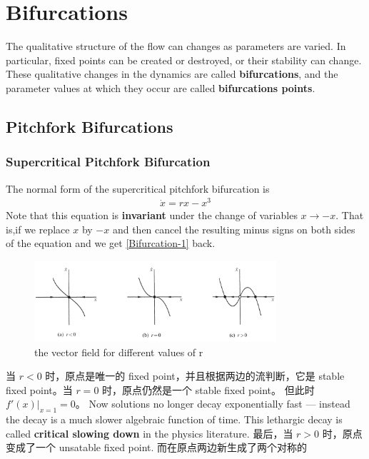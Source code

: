 \section{Bifurcations}
The qualitative structure of the flow can changes as parameters are varied. In particular, 
fixed points can be created or destroyed, or their stability can change. These qualitative 
changes in the dynamics are called \textbf{bifurcations}, and the parameter values at which 
they occur are called \textbf{bifurcations points}.
\subsection{Pitchfork Bifurcations}
\subsubsection*{Supercritical Pitchfork Bifurcation}
The normal form of the supercritical pitchfork bifurcation is 
\begin{equation}
    \begin{aligned} 
    \dot{x} = rx - x^3
    \end{aligned} 
    \label{Bifurcation-1}
\end{equation}
Note that this equation is \textbf{invariant} under the change of variables $ x \rightarrow -x $.
That is,if we replace $ x $ by $ -x $ and then cancel the resulting minus signs on both sides 
of the equation and we get \ref{Bifurcation-1} back.
\begin{figure}[htbp]
    \centering
    \includegraphics[width=0.8\textwidth]{figures/Bifurcation-1.png}
    \caption{the vector field for different values of r}
\end{figure}
当 $ r < 0 $ 时，原点是唯一的 fixed point，并且根据两边的流判断，它是 stable fixed point。当
 $ r = 0 $ 时，原点仍然是一个 stable fixed point。 但此时 $f'(x)|_{x=1} = 0$。 Now solutions 
 no longer decay exponentially fast --- instead the decay is a much slower algebraic function
 of time. This lethargic decay is called \textbf{critical slowing down} in the physics literature.
最后，当 $ r > 0 $ 时，原点变成了一个 unsatable fixed point. 而在原点两边新生成了两个对称的
